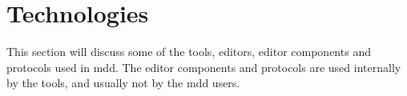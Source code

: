 \section{Technologies}\label{sec:technologies}

This section will discuss some of the tools, editors, editor components and protocols used in \acrlong{mdd}.
The editor components and protocols are used internally by the tools, and usually not by the \acrshort{mdd} users.







